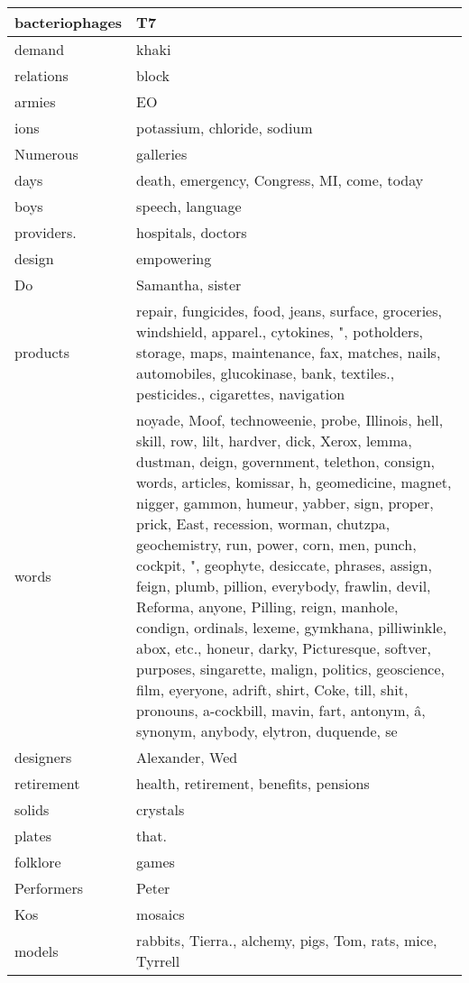 \begin{longtable}{|l|p{11cm}|}
  \hline
  bacteriophages & T7 \\
  \hline
  demand & khaki \\
  \hline
  relations & block \\
  \hline
  armies & EO \\
  \hline
  ions & potassium, chloride, sodium \\
  \hline
  Numerous & galleries \\
  \hline
  days & death, emergency, Congress, MI, come, today \\
  \hline
  boys & speech, language \\
  \hline
  providers. & hospitals, doctors \\
  \hline
  design & empowering \\
  \hline
  Do & Samantha, sister \\
  \hline
  products & repair, fungicides, food, jeans, surface, groceries, windshield, apparel., cytokines, ", potholders, storage, maps, maintenance, fax, matches, nails, automobiles, glucokinase, bank, textiles., pesticides., cigarettes, navigation \\
  \hline
  words & noyade, Moof, technoweenie, probe, Illinois, hell, skill, row, lilt, hardver, dick, Xerox, lemma, dustman, deign, government, telethon, consign, words, articles, komissar, h, geomedicine, magnet, nigger, gammon, humeur, yabber, sign, proper, prick, East, recession, worman, chutzpa, geochemistry, run, power, corn, men, punch, cockpit, ", geophyte, desiccate, phrases, assign, feign, plumb, pillion, everybody, frawlin, devil, Reforma, anyone, Pilling, reign, manhole, condign, ordinals, lexeme, gymkhana, pilliwinkle, abox, etc., honeur, darky, Picturesque, softver, purposes, singarette, malign, politics, geoscience, film, eyeryone, adrift, shirt, Coke, till, shit, pronouns, a-cockbill, mavin, fart, antonym, â, synonym, anybody, elytron, duquende, se \\
  \hline
  designers & Alexander, Wed \\
  \hline
  retirement & health, retirement, benefits, pensions \\
  \hline
  solids & crystals \\
  \hline
  plates & that. \\
  \hline
  folklore & games \\
  \hline
  Performers & Peter \\
  \hline
  Kos & mosaics \\
  \hline
  models & rabbits, Tierra., alchemy, pigs, Tom, rats, mice, Tyrrell \\

\end{longtable}
